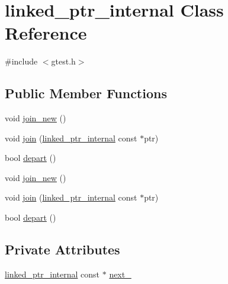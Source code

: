 \hypertarget{classtesting_1_1internal_1_1linked__ptr__internal}{\section{linked\-\_\-ptr\-\_\-internal \-Class \-Reference}
\label{d7/d67/classtesting_1_1internal_1_1linked__ptr__internal}
}


{\ttfamily \#include $<$gtest.\-h$>$}

\subsection*{\-Public \-Member \-Functions}
\begin{DoxyCompactItemize}
\item 
void \hyperlink{classtesting_1_1internal_1_1linked__ptr__internal_a079f6335d19865e8f3c8ceb1dba2bb4d}{join\-\_\-new} ()
\item 
void \hyperlink{classtesting_1_1internal_1_1linked__ptr__internal_a5d470b93c8bbde0516f2df9e3e06eb72}{join} (\hyperlink{classtesting_1_1internal_1_1linked__ptr__internal}{linked\-\_\-ptr\-\_\-internal} const $\ast$ptr)
\item 
bool \hyperlink{classtesting_1_1internal_1_1linked__ptr__internal_a904bf8d3cc06d04817ef205ce7ea2963}{depart} ()
\item 
void \hyperlink{classtesting_1_1internal_1_1linked__ptr__internal_a079f6335d19865e8f3c8ceb1dba2bb4d}{join\-\_\-new} ()
\item 
void \hyperlink{classtesting_1_1internal_1_1linked__ptr__internal_a5d470b93c8bbde0516f2df9e3e06eb72}{join} (\hyperlink{classtesting_1_1internal_1_1linked__ptr__internal}{linked\-\_\-ptr\-\_\-internal} const $\ast$ptr)
\item 
bool \hyperlink{classtesting_1_1internal_1_1linked__ptr__internal_a904bf8d3cc06d04817ef205ce7ea2963}{depart} ()
\end{DoxyCompactItemize}
\subsection*{\-Private \-Attributes}
\begin{DoxyCompactItemize}
\item 
\hyperlink{classtesting_1_1internal_1_1linked__ptr__internal}{linked\-\_\-ptr\-\_\-internal} const $\ast$ \hyperlink{classtesting_1_1internal_1_1linked__ptr__internal_a3373437814bc3d37f0f3d4b821698b71}{next\-\_\-}
\end{DoxyCompactItemize}


